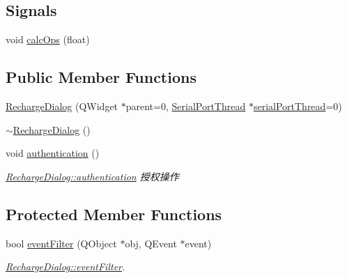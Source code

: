 \subsection*{Signals}
\begin{DoxyCompactItemize}
\item 
void \mbox{\hyperlink{class_recharge_dialog_a9048dce00d14b245f88e8059db81db63}{calc\+Ops}} (float)
\end{DoxyCompactItemize}
\subsection*{Public Member Functions}
\begin{DoxyCompactItemize}
\item 
\mbox{\hyperlink{class_recharge_dialog_aadb3a8b39a5467cb746d639f8f018d39}{Recharge\+Dialog}} (Q\+Widget $\ast$parent=0, \mbox{\hyperlink{class_serial_port_thread}{Serial\+Port\+Thread}} $\ast$\mbox{\hyperlink{class_recharge_dialog_a9d33c6c98810ddf8958e6055aa6664af}{serial\+Port\+Thread}}=0)
\item 
\mbox{\hyperlink{class_recharge_dialog_ab46f1f766c86af5c9a443b1bc9514632}{$\sim$\+Recharge\+Dialog}} ()
\item 
void \mbox{\hyperlink{class_recharge_dialog_a2dedb3b3a01202645d6375e41282bb11}{authentication}} ()
\begin{DoxyCompactList}\small\item\em \mbox{\hyperlink{class_recharge_dialog_a2dedb3b3a01202645d6375e41282bb11}{Recharge\+Dialog\+::authentication}} 授权操作 \end{DoxyCompactList}\end{DoxyCompactItemize}
\subsection*{Protected Member Functions}
\begin{DoxyCompactItemize}
\item 
bool \mbox{\hyperlink{class_recharge_dialog_a3a39227ec39401c1735b7280c2744a8c}{event\+Filter}} (Q\+Object $\ast$obj, Q\+Event $\ast$event)
\begin{DoxyCompactList}\small\item\em \mbox{\hyperlink{class_recharge_dialog_a3a39227ec39401c1735b7280c2744a8c}{Recharge\+Dialog\+::event\+Filter}}. \end{DoxyCompactList}\end{DoxyCompactItemize}
